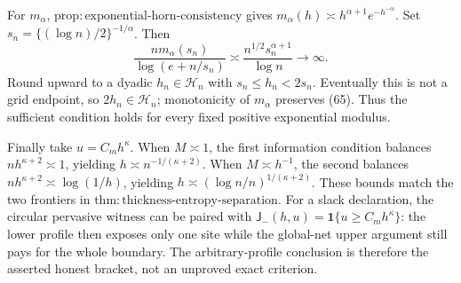 For \(m_\alpha\),
\(\mathrm{prop:exponential\text{-}horn\text{-}consistency}\) gives
\(m_\alpha(h)\asymp h^{\alpha+1}e^{-h^{-\alpha}}\).  Set
\(s_n=\{(\log n)/2\}^{-1/\alpha}\).  Then
\[
 \frac{nm_\alpha(s_n)}{\log(e+n/s_n)}
 \asymp\frac{n^{1/2}s_n^{\alpha+1}}{\log n}\longrightarrow\infty.
 \tag{65}
\]
Round upward to a dyadic \(h_n\in\mathcal H_n\) with
\(s_n\le h_n<2s_n\).  Eventually this is not a grid endpoint, so
\(2h_n\in\mathcal H_n\); monotonicity of \(m_\alpha\) preserves (65).
Thus the sufficient condition holds for every fixed positive exponential
modulus.

Finally take \(u=C_mh^\kappa\).  When \(M\asymp1\), the first information
condition balances \(nh^{\kappa+2}\asymp1\), yielding
\(h\asymp n^{-1/(\kappa+2)}\).  When \(M\asymp h^{-1}\), the second
balances \(nh^{\kappa+2}\asymp\log(1/h)\), yielding
\(h\asymp(\log n/n)^{1/(\kappa+2)}\).  These bounds match the two
frontiers in \(\mathrm{thm:thickness\text{-}entropy\text{-}separation}\).
For a slack declaration, the circular pervasive witness can be paired
with \(\mathsf J_{-}(h,u)=\mathbf1\{u\ge C_mh^\kappa\}\): the lower
profile then exposes only one site while the global-net upper argument
still pays for the whole boundary.  The arbitrary-profile conclusion is
therefore the asserted honest bracket, not an unproved exact criterion.